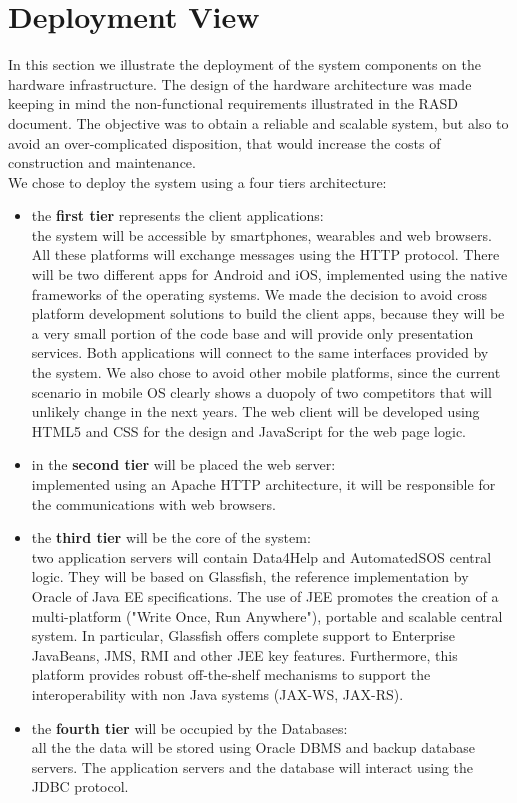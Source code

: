 \section{Deployment	View}
In this section we illustrate the deployment of the system components on the hardware infrastructure.
The design of the hardware architecture was made keeping in mind the non-functional requirements illustrated in the RASD document. The objective was to obtain a reliable and scalable system, but also to avoid an over-complicated disposition, that would increase the costs of construction and maintenance. \\
We chose to deploy the system using a four tiers architecture:
\begin{itemize}
    \item the \textbf{first tier} represents the client applications:\\the system will be accessible by smartphones, wearables and web browsers. All these platforms will exchange messages using the HTTP protocol. There will be two different apps for Android and iOS, implemented using the native frameworks of the operating systems. We made the decision to avoid cross platform development solutions to build the client apps, because they will be a very small portion of the code base and will provide only presentation services. Both applications will connect to the same interfaces provided by the system. We also chose to avoid other mobile platforms, since the current scenario in mobile OS clearly shows a duopoly of two competitors that will unlikely change in the next years.
    The web client will be developed using HTML5 and CSS for the design and JavaScript for the web page logic.
    \item in the \textbf{second tier} will be placed the web server:\\implemented using an Apache HTTP architecture, it will be responsible  for the communications with web browsers.
    \item the \textbf{third tier} will be the core of the system:\\two application servers will contain Data4Help and AutomatedSOS central logic. They will be based on Glassfish\cite{GlassFish}, the reference implementation by Oracle of Java EE\cite{JEE} specifications. The use of JEE promotes the creation of a multi-platform ("Write Once, Run Anywhere"), portable and scalable central system.
    In particular, Glassfish offers complete support to Enterprise JavaBeans, JMS, RMI and other JEE key features. Furthermore, this platform provides robust off-the-shelf mechanisms to support the interoperability with non Java systems (JAX-WS, JAX-RS).
    \item the \textbf{fourth tier} will be occupied by the Databases:\\all the the data will be stored using Oracle DBMS and backup database servers. The application servers and the database will interact using the JDBC protocol.
\end{itemize}

